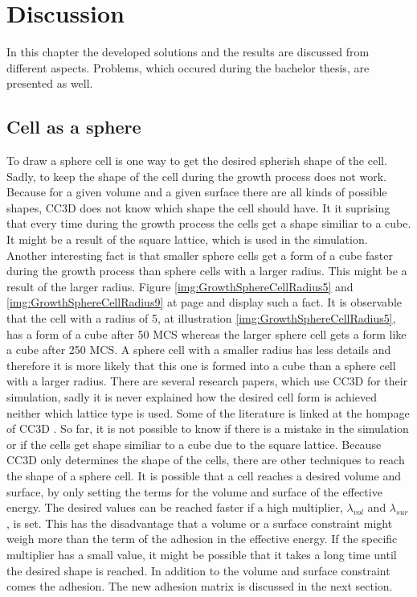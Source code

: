 \chapter{Discussion}
In this chapter the developed solutions and the results are discussed from different aspects. Problems, which occured during the bachelor thesis, are presented as well.

\section{Cell as a sphere}
To draw a sphere cell is one way to get the desired spherish shape of the cell. Sadly, to keep the shape of the cell during the growth process does not work. Because for a given volume and a given surface there are all kinds of possible shapes, \ac{CC3D} does not know which shape the cell should have. It it suprising that every time during the growth process the cells get a shape similiar to a cube. It might be a result of the square lattice, which is used in the simulation. Another interesting fact is that smaller sphere cells get a form of a cube faster during the growth process than sphere cells with a larger radius. This might be a result of the larger radius. Figure \ref{img:GrowthSphereCellRadius5} and \ref{img:GrowthSphereCellRadius9} at page \pageref{img:GrowthSphereCellRadius5} and \pageref{img:GrowthSphereCellRadius9} display such a fact. It is observable that the cell with a radius of 5, at illustration \ref{img:GrowthSphereCellRadius5}, has a form of a cube after 50 \ac{MCS} whereas the larger sphere cell gets a form like a cube after 250 \ac{MCS}. A sphere cell with a smaller radius has less details and therefore it is more likely that this one is formed into a cube than a sphere cell with a larger radius. \newline
There are several research papers, which use \ac{CC3D} for their simulation, sadly it is never explained how the desired cell form is achieved neither which lattice type is used. Some of the literature is linked at the hompage of \ac{CC3D} \cite{CC3D.org}. So far, it is not possible to know if there is a mistake in the simulation or if the cells get shape similiar to a cube due to the square lattice. \newline
Because \ac{CC3D} only determines the shape of the cells, there are other techniques to reach the shape of a sphere cell. It is possible that a cell reaches a desired volume and surface, by only setting the terms for the volume and surface of the effective energy. The desired values can be reached faster if a high multiplier, $\lambda_{vol}$ and $\lambda_{sur}$, is set. This has the disadvantage that a volume or a surface constraint might weigh more than the term of the adhesion in the effective energy. If the specific multiplier has a small value, it might be possible that it takes a long time until the desired shape is reached. In addition to the volume and surface constraint comes the adhesion. The new adhesion matrix is discussed in the next section.


